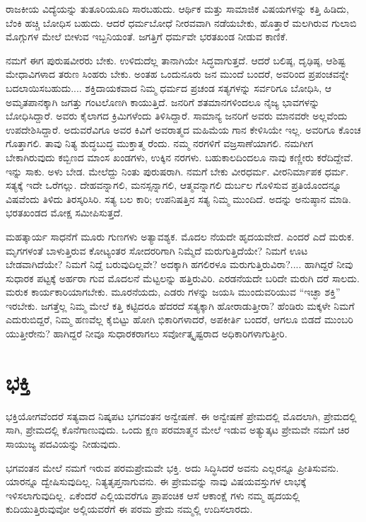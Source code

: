 ರಾಜಕೀಯ ವಿದ್ಯೆಯನ್ನು ತುತೂರಿಯೂದಿ ಸಾರಬಹುದು. ಆರ್ಥಿಕ ಮತ್ತು ಸಾಮಾಜಿಕ ವಿಷಯಗಳನ್ನು ಕತ್ತಿ ಹಿಡಿದು, ಬೆಂಕಿ ಹಚ್ಚಿ ಬೋಧಿಸ ಬಹುದು. ಆದರೆ ಧರ್ಮಬೋಧೆ ನೀರವವಾಗಿ ನಡೆಯಬೇಕು, ಹೊತ್ತಾರೆ ಮಲಗಿರುವ ಗುಲಾಬಿ ಮೊಗ್ಗುಗಳ ಮೇಲೆ ಬೀಳುವ ಇಬ್ಬನಿಯಂತೆ. ಜಗತ್ತಿಗೆ ಧರ್ಮವೇ ಭರತಖಂಡ ನೀಡುವ ಕಾಣಿಕೆ.

ನಮಗೆ ಈಗ ಪುರುಷವೀರರು ಬೇಕು. ಉಳಿದುದೆಲ್ಲ ತಾನಾಗಿಯೇ ಸಿದ್ಧವಾಗುತ್ತದೆ. ಆದರೆ ಬಲಿಷ್ಠ, ದೃಢಿಷ್ಠ, ಆಶಿಷ್ಟ ಮೇಧಾವಿಗಳಾದ ತರುಣ ಸಿಂಹರು ಬೇಕು. ಅಂತಹ ಒಂದುನೂರು ಜನ ಮುಂದೆ ಬಂದರೆ, ಅವರಿಂದ ಪ್ರಪಂಚವನ್ನೇ ಬದಲಾಯಿಸಬಹುದು.... ಶಕ್ತಿದಾಯಕವಾದ ನಿಮ್ಮ ಧರ್ಮದ ಪ್ರಚಂಡ ಸತ್ಯಗಳನ್ನು ಸರ್ವರಿಗೂ ಬೋಧಿಸಿ, ಆ ಅಮೃತಪಾನಕ್ಕಾಗಿ ಜಗತ್ತು ಗಂಟಲೊಣಗಿ ಕಾಯುತ್ತಿದೆ. ಜನರಿಗೆ ಶತಮಾನಗಳಿಂದಲೂ ನೈಜ್ಯ ಭಾವಗಳನ್ನು ಬೋಧಿಸಿದ್ದಾರೆ. ಅವರು ಕೈಲಾಗದ ಕ್ರಿಮಿಗಳೆಂದು ತಿಳಿಸಿದ್ದಾರೆ. ಸಾಮಾನ್ಯ ಜನರಿಗೆ ಅವರು ಮಾನವರೇ ಅಲ್ಲವೆಂದು ಉಪದೇಶಿಸಿದ್ದಾರೆ. ಅದುವರೆವಿಗೂ ಅವರ ಕಿವಿಗೆ ಅವರಾತ್ಮದ ಮಹಿಮೆಯ ಗಾನ ಕೇಳಿಸಿಯೇ ಇಲ್ಲ. ಅವರಿಗೂ ಕೊಂಚ ಗೊತ್ತಾಗಲಿ. ತಾವು ನಿತ್ಯ ಶುದ್ಧಬುದ್ಧ ಮುಕ್ತಾತ್ಮ ರೆಂದು. ನಮ್ಮ ನರಗಳಿಗೆ ವಜ್ರಸಾಣೆಯಾಗಲಿ. ನಮಗೀಗ ಬೇಕಾಗಿರುವುದು ಕಬ್ಬಿಣದ ಮಾಂಸ ಖಂಡಗಳು, ಉಕ್ಕಿನ ನರಗಳು. ಬಹುಕಾಲದಿಂದಲೂ ನಾವು ಕಣ್ಣೀರು ಕರೆದಿದ್ದೇವೆ. ಇನ್ನು ಸಾಕು. ಅಳು ಬೇಡ. ಮೇಲೆದ್ದು ನಿಂತು ಪುರುಷರಾಗಿ. ನಮಗೆ ಬೇಕು ವೀರಧರ್ಮ. ವೀರನಿರ್ಮಾಪಕ ಧರ್ಮ. ಸತ್ಯಕ್ಕೆ ಇದೇ ಒರೆಗಲ್ಲು. ದೇಹವನ್ನಾಗಲಿ, ಮನಸ್ಸನ್ನಾಗಲಿ, ಆತ್ಮವನ್ನಾಗಲಿ ದುರ್ಬಲ ಗೊಳಿಸುವ ಪ್ರತಿಯೊಂದನ್ನೂ ವಿಷವೆಂದು ತಿಳಿದು ತಿರಸ್ಕರಿಸಿರಿ. ಸತ್ಯ ಬಲ ಕಾರಿ; ಉಪನಿಷತ್ತಿನ ಸತ್ಯ ನಿಮ್ಮ ಮುಂದಿದೆ. ಅದನ್ನು ಅನುಷ್ಠಾನ ಮಾಡಿ. ಭರತಖಂಡದ ಮೋಕ್ಷ ಸಮೀಪಿಸುತ್ತದೆ.

ಮಹತ್ಕಾರ್ಯ ಸಾಧನೆಗೆ ಮೂರು ಗುಣಗಳು ಅತ್ಯಾವಶ್ಯಕ. ಮೊದಲ ನೆಯದೇ ಹೃದಯವೇದೆ. ಎಂದರೆ ಎದೆ ಮರುಕ. ಮೃಗಗಳಂತೆ ಬಾಳುತ್ತಿರುವ ಕೋಟ್ಯಂತರ ಸೋದರರಿಗಾಗಿ ನಿಮ್ಮೆದೆ ಮರುಗುತ್ತಿದೆಯೇ? ನಿಮಗೆ ಊಟ ಬೇಡವಾಗಿದೆಯೇ? ನಿಮಗೆ ನಿದ್ದೆ ಬರುವುದಿಲ್ಲವೇ? ಅದಕ್ಕಾಗಿ ಹಗಲಿರಳೂ ಮರುಗುತ್ತಿರುವಿರಾ?.... ಹಾಗಿದ್ದರೆ ನೀವು ಸುಧಾರಕ ಪಟ್ಟಕ್ಕೆ ಅರ್ಹರಾ ಗುವ ಮೊದಲನೆ ಮೆಟ್ಟಲನ್ನು ಹತ್ತಿರುವಿರಿ. ಎರಡನೆಯದೇ ಬರಿದೇ ಮರುಗಿ ದರೆ ಸಾಲದು. ಮರುಕ ಕಾರ್ಯಕಾರಿಯಾಗಬೇಕು. ಮೂರನೆಯದು, ಎಡರು ಗಳನ್ನು ಜಯಸಿ ಮುಂದುವರಿಯುವ “ಇಚ್ಛಾ ಶಕ್ತಿ” ಇರಬೇಕು. ಜಗತ್ತೆಲ್ಲ ನಿಮ್ಮ ಮೇಲೆ ಕತ್ತಿ ಕಟ್ಟಿದರೂ ಹೆದರದೆ ಸತ್ಯಕ್ಕಾಗಿ ಹೋರಾಡುತ್ತೀರಾ? ಹೆಂಡಿರು ಮಕ್ಕಳೇ ನಿಮಗೆ ಎದುರುಬಿದ್ದರೆ, ನಿಮ್ಮ ಹಣವೆಲ್ಲ ಕೈಬಿಟ್ಟು ಹೋಗಿ ಭಿಕಾರಿಗಳಾದರೆ, ಅಪಕೀರ್ತಿ ಬಂದರೆ, ಆಗಲೂ ಬಿಡದೆ ಮುಂಬರಿ ಯುತ್ತೀರೇನು? ಹಾಗಿದ್ದರೆ ನೀವೂ ಸುಧಾರಕರಾಗಲು ಸರ್ವೋತ್ಕೃಷ್ಟರಾದ ಅಧಿಕಾರಿಗಳಾಗುತ್ತೀರಿ.


\section{ಭಕ್ತಿ}

ಭಕ್ತಿಯೋಗವೆಂದರೆ ಸತ್ಯವಾದ ನಿಷ್ಕಪಟ ಭಗವಂತನ ಅನ್ವೇಷಣೆ. ಈ ಅನ್ವೇಷಣೆ ಪ್ರೇಮದಲ್ಲಿ ಮೊದಲಾಗಿ, ಪ್ರೇಮದಲ್ಲಿ ಸಾಗಿ, ಪ್ರೇಮದಲ್ಲಿ ಕೊನೆಗಾಣುವುದು. ಒಂದು ಕ್ಷಣ ಪರಮಾತ್ಮನ ಮೇಲೆ ಇಡುವ ಅತ್ಯುತ್ಕಟ ಪ್ರೇಮವೇ ನಮಗೆ ಚಿರ ಸಾಯುಜ್ಯ ಪದವಿಯನ್ನು ನೀಡುವುದು.

ಭಗವಂತನ ಮೇಲೆ ನಮಗೆ ಇರುವ ಪರಮಪ್ರೇಮವೇ ಭಕ್ತಿ. ಅದು ಸಿದ್ಧಿಸಿದರೆ ಅವನು ಎಲ್ಲರನ್ನೂ ಪ್ರೀತಿಸುವನು. ಯಾರನ್ನೂ ದ್ವೇಷಿಸುವುದಿಲ್ಲ. ನಿತ್ಯತೃಪ್ತನಾಗುವನು. ಈ ಪ್ರೇಮವನ್ನು ನಾವು ವಿಷಯವಸ್ತುಗಳ ಲಾಭಕ್ಕೆ ಇಳಿಸಲಾಗುವುದಿಲ್ಲ. ಏಕೆಂದರೆ ಎಲ್ಲಿಯವರೆಗೂ ಪ್ರಾಪಂಚಿಕ ಆಸೆ ಆಕಾಂಕ್ಷೆ ಗಳು ನಮ್ಮ ಹೃದಯಲ್ಲಿ ಕುದಿಯುತ್ತಿರುವುವೋ ಅಲ್ಲಿಯವರೆಗೆ ಈ ಪರಮ ಪ್ರೇಮ ನಮ್ಮಲ್ಲಿ ಉದಿಸಲಾರದು.

